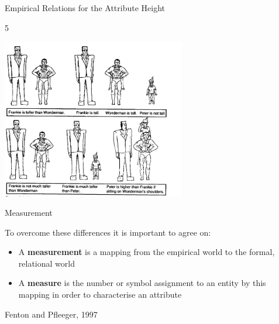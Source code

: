 \documentclass{beamer}
\begin{document}
\begin{frame}{\centerline{Empirical Relations for the Attribute Height
}}
5

\begin{center}
\includegraphics[width=80mm]{A2022.IDSEPC.SperimentazioneDeduzione/img-img08.png}
\end{center}

\end{frame}

\begin{frame}{\centerline{Measurement}}

To overcome these differences it is important to agree on:

\begin{itemize}
\item  A \textbf{measurement} is a mapping from the empirical world to the formal, relational world
\item  A \textbf{measure} is the number or symbol assignment to an entity by this mapping in order to characterise an attribute
\end{itemize}

\begin{flushright}
Fenton and Pfleeger, 1997
\end{flushright}

\end{frame}
\end{document}
